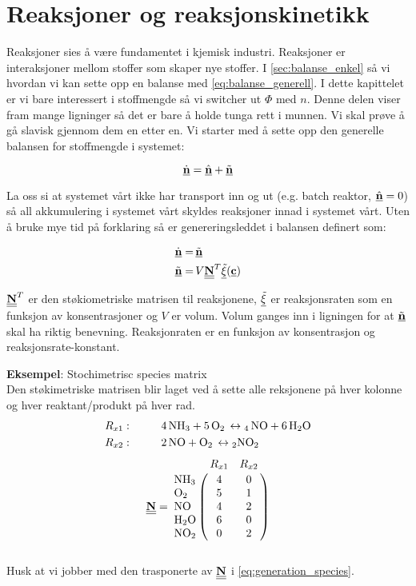 \clearpage
\section{Reaksjoner og reaksjonskinetikk}\label{sec:kinetics}
Reaksjoner sies å være fundamentet i kjemisk industri. Reaksjoner er interaksjoner mellom stoffer som skaper nye stoffer. I \cref{sec:balanse_enkel} så vi hvordan vi kan sette opp en balanse med \cref{eq:balanse_generell}. I dette kapittelet er vi bare interessert i stoffmengde så vi switcher ut $\Phi$ med $n$. Denne delen viser fram mange ligninger så det er bare å holde tunga rett i munnen. Vi skal prøve å gå slavisk gjennom dem en etter en. Vi starter med å sette opp den generelle balansen for stoffmengde i systemet:

\begin{equation}
    \label{eq:spacies_balance}
    \underline{\dot{\textbf{n}}} = \underline{\hat{\textbf{n}}} + \underline{\Tilde{\textbf{n}}}
\end{equation}

La oss si at systemet vårt ikke har transport inn og ut (e.g. batch reaktor, $\underline{\hat{\textbf{n}}}=0$) så all akkumulering i systemet vårt skyldes reaksjoner innad i systemet vårt. Uten å bruke mye tid på forklaring så er genereringsleddet i balansen definert som:

\begin{equation}
    \begin{split}
    \label{eq:generation_species}
    \underline{\dot{\textbf{n}}} =&\,  \underline{\Tilde{\textbf{n}}}\\
    \underline{\Tilde{\textbf{n}}}=&\,V\underline{\underline{\textbf{N}}}^T\underline{\Tilde{\xi}}(\underline{\textbf{c}})
    \end{split}
\end{equation}



$\underline{\underline{\textbf{N}}}^T$ er den støkiometriske matrisen til reaksjonene, $\underline{\Tilde{\xi}}$ er reaksjonsraten som en funksjon av konsentrasjoner og $V$ er volum. Volum ganges inn i ligningen for at $\underline{\Tilde{\textbf{n}}}$ skal ha riktig benevning. Reaksjonraten er en funksjon av konsentrasjon og reaksjonsrate-konstant. 

\textbf{Eksempel}: Stochimetrisc species matrix\\
Den støkimetriske matrisen blir laget ved å sette alle reksjonene på hver kolonne og hver reaktant/produkt på hver rad. 
\begin{align*}
    R_{x1}:&\hspace{1cm} \ce{4 NH3 + 5 O2 \leftrightarrow 4 NO + 6 H2O} \\
    R_{x2}:&\hspace{1cm} \ce{2NO + O2 \leftrightarrow 2NO2}\\
\end{align*}
\begin{equation}
    \mymat{N} = 
    \bordermatrix{~ & R_{x1} & R_{x2}   \cr
                  \ce{NH3} & 4 & 0  \cr
                  \ce{O2} & 5 & 1 \cr
                  \ce{NO} & 4 & 2 \cr
                  \ce{H2O} & 6 & 0 \cr
                  \ce{NO2} & 0 & 2
                  }
\end{equation}\\
Husk at vi jobber med den trasponerte av $\underline{\underline{\textbf{N}}}$ i \cref{eq:generation_species}. 
